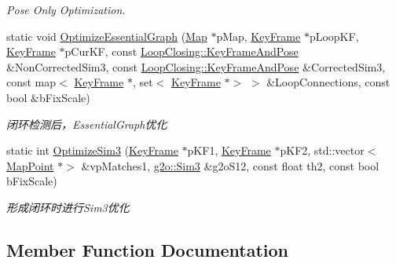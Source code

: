 \begin{DoxyCompactItemize}
\begin{DoxyCompactList}\small\item\em Pose Only Optimization. \end{DoxyCompactList}\item 
static void \mbox{\hyperlink{class_o_r_b___s_l_a_m2_1_1_optimizer_a5a53ab409feed7f92547eb79a2d7f6e9}{Optimize\+Essential\+Graph}} (\mbox{\hyperlink{class_o_r_b___s_l_a_m2_1_1_map}{Map}} $\ast$p\+Map, \mbox{\hyperlink{class_o_r_b___s_l_a_m2_1_1_key_frame}{Key\+Frame}} $\ast$p\+Loop\+KF, \mbox{\hyperlink{class_o_r_b___s_l_a_m2_1_1_key_frame}{Key\+Frame}} $\ast$p\+Cur\+KF, const \mbox{\hyperlink{class_o_r_b___s_l_a_m2_1_1_loop_closing_ae9ada143a8308ce32990a7c7b5d533ab}{Loop\+Closing\+::\+Key\+Frame\+And\+Pose}} \&Non\+Corrected\+Sim3, const \mbox{\hyperlink{class_o_r_b___s_l_a_m2_1_1_loop_closing_ae9ada143a8308ce32990a7c7b5d533ab}{Loop\+Closing\+::\+Key\+Frame\+And\+Pose}} \&Corrected\+Sim3, const map$<$ \mbox{\hyperlink{class_o_r_b___s_l_a_m2_1_1_key_frame}{Key\+Frame}} $\ast$, set$<$ \mbox{\hyperlink{class_o_r_b___s_l_a_m2_1_1_key_frame}{Key\+Frame}} $\ast$$>$ $>$ \&Loop\+Connections, const bool \&b\+Fix\+Scale)
\begin{DoxyCompactList}\small\item\em 闭环检测后，\+Essential\+Graph优化 \end{DoxyCompactList}\item 
static int \mbox{\hyperlink{class_o_r_b___s_l_a_m2_1_1_optimizer_a91fbb960965c99e9802a5de45515813c}{Optimize\+Sim3}} (\mbox{\hyperlink{class_o_r_b___s_l_a_m2_1_1_key_frame}{Key\+Frame}} $\ast$p\+K\+F1, \mbox{\hyperlink{class_o_r_b___s_l_a_m2_1_1_key_frame}{Key\+Frame}} $\ast$p\+K\+F2, std\+::vector$<$ \mbox{\hyperlink{class_o_r_b___s_l_a_m2_1_1_map_point}{Map\+Point}} $\ast$$>$ \&vp\+Matches1, \mbox{\hyperlink{structg2o_1_1_sim3}{g2o\+::\+Sim3}} \&g2o\+S12, const float th2, const bool b\+Fix\+Scale)
\begin{DoxyCompactList}\small\item\em 形成闭环时进行\+Sim3优化 \end{DoxyCompactList}\end{DoxyCompactItemize}


\subsection{Member Function Documentation}
\mbox{\label{class_o_r_b___s_l_a_m2_1_1_optimizer_aac6bf926792ed8a013d64897879a89ec}} 
